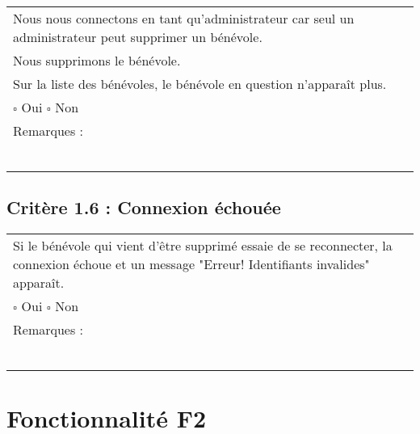		\begin{center}
    	 		\begin{tabular}[h]{|p{}|}
			\hline
				Nous nous connectons en tant qu'administrateur car seul un administrateur peut supprimer un bénévole. \\
				Nous supprimons le bénévole. \\
				Sur la liste des bénévoles, le bénévole en question n'apparaît plus. \\
				
				$\square$ Oui  \hfill \hfill $\square$ Non \\\hline Remarques : \\ ~\\
			 \\\hline
     		\end{tabular}
  		\end{center}	
  		
  	\subsection*{Critère 1.6 : Connexion échouée}
	
		\begin{center}
    	 		\begin{tabular}[h]{|p{}|}
			\hline
				Si le bénévole qui vient d'être supprimé essaie de se reconnecter, la connexion échoue et un message "Erreur! Identifiants invalides" apparaît. \\
				
				$\square$ Oui  \hfill \hfill $\square$ Non \\\hline Remarques : \\ ~\\
			 \\\hline
     		\end{tabular}
  		\end{center}	
  		
  		
\section{Fonctionnalité F2}
  		
